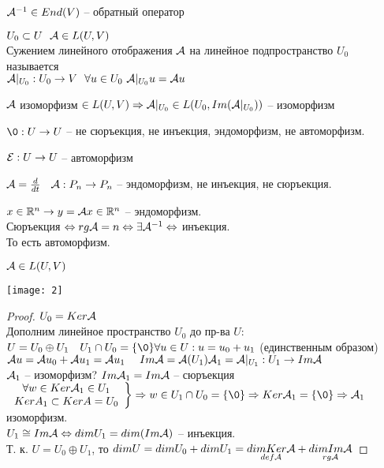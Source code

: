 \documentclass[../spring.tex]{subfiles}
\begin{document}
	$\mathcal{A}^{-1}\in End(V)$ -- обратный оператор
	\begin{defin}
		$U_0 \subset U \ \ \mathcal{A}\in L(U, V)$\\
		Сужением линейного отображения $\mathcal{A}$ на линейное подпространство $U_0$ называется \\
		$\mathcal{A}|_{U_0}: U_0 \rightarrow V \ \ \forall u \in U_0 \ \mathcal{A}|_{U_0} u = \mathcal{A} u$
	\end{defin}
	\begin{stat}
		$\mathcal{A}$ изоморфизм $\in L(U, V) \Rightarrow  \mathcal{A}|_{U_0}\in L(U_0, Im(\mathcal{A}|_{U_0}))$ -- изоморфизм
	\end{stat}
	\begin{examples}
		\hfil
		\begin{mylist}
			\item $\0: U\rightarrow U$ -- не сюръекция, не инъекция, эндоморфизм, не автоморфизм.
			\item $\mathcal{E}: U \rightarrow U$ -- автоморфизм
			\item 
			$\mathcal{A} = \frac{d}{dt}$ \  
			$\mathcal{A}: P_n \rightarrow P_n$ -- эндоморфизм, не инъекция, не сюръекция.
			\item $x\in \mathbb R^n \rightarrow y = \mathcal{A} x \in \mathbb R^n$ -- эндоморфизм. \\
			Сюръекция $\Leftrightarrow rg\mathcal{A} = n \Leftrightarrow \exists \mathcal{A}^{-1} \Leftrightarrow$ инъекция.\\
			То есть автоморфизм.
		\end{mylist}
	\end{examples}
	\begin{theorem}
		$\mathcal{A}\in L(U, V)$\\
	\end{theorem}
	\texttt{[image: 2]}
	\begin{proof}
		$U_0 = Ker\mathcal{A}$\\
		Дополним линейное пространство $U_0$ до пр-ва $U$:\\
		$U = U_0 \oplus U_1 \ \ \ U_1 \cap U_0 = \{ \0 \}\\
		\forall u \in U : u = u_0 + u_1$ (единственным образом)\\
		$\mathcal{A} u = \mathcal{A} u_0 + \mathcal{A} u_1 = \mathcal{A} u_1 \ \ \ \ Im\mathcal{A} = \mathcal{A}(U_1)\\
		\mathcal{A}_1 = \mathcal{A}|_{U_1}: U_1 \rightarrow Im\mathcal{A}$ \\
		$\mathcal{A}_1$ -- изоморфизм? $Im\mathcal{A}_1 = Im\mathcal{A}$ -- сюръекция\\
		$\left.\begin{array}{c}
		\forall w \in Ker\A_1 \in U_1\\
		KerA_1 \subset KerA = U_0
		\end{array}\right \}
		\Rightarrow w \in U_1 \cap U_0 = \{\0\} \Rightarrow Ker\A_1 = \{\0\}\Rightarrow \A_1$ изоморфизм.\\
		$U_1 \cong Im\mathcal{A} \Leftrightarrow dimU_1 = dim(Im\mathcal{A})$ -- инъекция.\\
		Т. к. $U = U_0 \oplus U_1$, то $dimU = dimU_0 + dimU_1 = \underset{def\mathcal{A}}{dimKer\mathcal{A}} + \underset{rg\mathcal{A}}{dimIm\mathcal{A}}$
	\end{proof}
\end{document}
